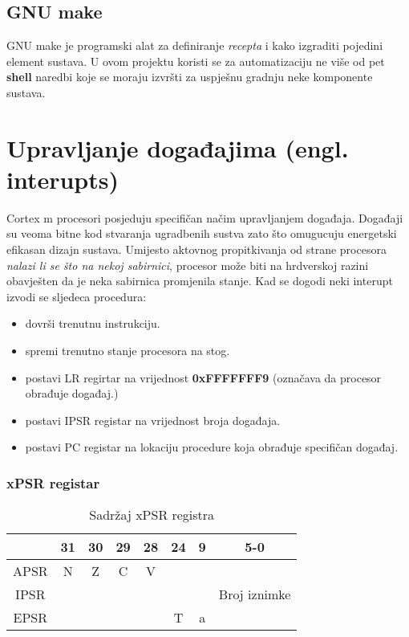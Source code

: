 \documentclass[times, utf8, diplomski]{diplomski}
\begin{document}
\subsection{GNU make}
GNU make je programski alat za definiranje \textit{recepta} i kako izgraditi pojedini element sustava. U ovom projektu koristi se za automatizaciju ne više od pet \textbf{shell} naredbi koje se moraju izvršti za uspješnu gradnju neke komponente sustava.

\section{Upravljanje događajima (engl. interupts)}
Cortex m procesori posjeduju specifičan načim upravljanjem događaja. Događaji su veoma bitne kod stvaranja ugradbenih sustva zato što omugucuju energetski efikasan dizajn sustava.
Umijesto aktovnog propitkivanja od strane procesora \textit{nalazi li se što na nekoj sabirnici}, procesor može biti na hrdverskoj razini obavješten da je neka sabirnica promjenila stanje.
Kad se dogodi neki interupt izvodi se sljedeca procedura:

\begin{itemize}
  \item dovrši trenutnu instrukciju.
  \item spremi trenutno stanje procesora na stog.
  \item postavi LR regirtar na vrijednost \textbf{0xFFFFFFF9} (označava da procesor obrađuje događaj.)
  \item postavi IPSR registar na vrijednost broja događaja.
  \item postavi PC registar na lokaciju procedure koja obrađuje specifičan događaj.
\end{itemize}

\subsubsection{xPSR registar}

\begin{table}[h]
  \begin{center}
    \begin{tabular}{c|c|c|c|c||c||c||c|}
      \cline{2-8} & 31 & 30 & 29 & 28 & 24 & 9 & 5-0\\
      \hline
      \multicolumn{1}{|c|}{APSR} & N & Z & C & V & \multicolumn{3}{c|}{ } \\
      \hline
      \multicolumn{1}{|c|}{IPSR} & \multicolumn{6}{c||}{ } & Broj iznimke \\
      \hline
      \multicolumn{1}{|c|}{EPSR} & \multicolumn{4}{c||}{ } & T & a & \\
      \hline
    \end{tabular}
    \caption{Sadržaj xPSR registra}
  \end{center}
\end{table}
\end{document}
